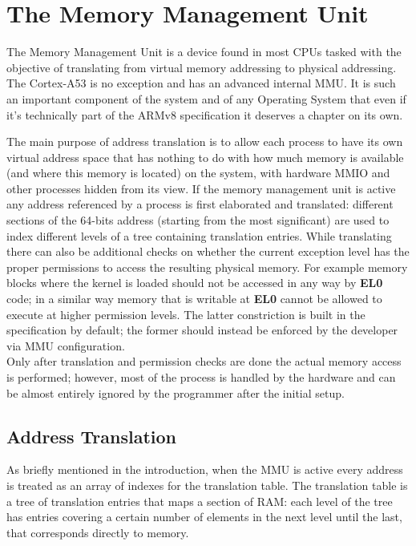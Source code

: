 \documentclass[12pt,a4paper,openright,twoside]{report}
\begin{document}
\clearpage{\pagestyle{empty}\cleardoublepage}
\chapter{The Memory Management Unit}
\label{mmu}
The Memory Management Unit is a device found in most CPUs tasked with the objective
of translating from virtual memory addressing to physical addressing. The Cortex-A53
is no exception and has an advanced internal MMU. It is such an important component
of the system and of any Operating System that even if it's technically 
part of the ARMv8 specification it deserves a chapter on its own.

The main purpose of address translation is to allow each process to have its own
virtual address space that has nothing to do with how much memory is available 
(and where this memory is located) on the system, with hardware MMIO and other
processes hidden from its view.
If the memory management unit is active any address referenced by a process is first
elaborated and translated: different sections of the 64-bits address (starting
from the most significant) are used to index different levels of a tree containing
translation entries. While translating there can also be additional checks on 
whether the current exception level has the proper permissions to access 
the resulting physical memory. For example memory blocks where the kernel is loaded
should not be accessed in any way by \textbf{EL0} code; in a similar way memory
that is writable at \textbf{EL0} cannot be allowed to execute at higher permission
levels. The latter constriction is built in the specification by default; the former
should instead be enforced by the developer via MMU configuration.\\
Only after translation and permission checks are done the actual memory access 
is performed; however, most of the process is handled by the hardware and 
can be almost entirely ignored by the programmer after the initial setup.

\section{Address Translation}
As briefly mentioned in the introduction, when the MMU is active every address is 
treated as an array of indexes for the translation table. The translation table is 
a tree of translation entries that maps a section of RAM: each level of the 
tree has entries covering a certain number of elements in the next level until the 
last, that corresponds directly to memory.\\
\end{document}
